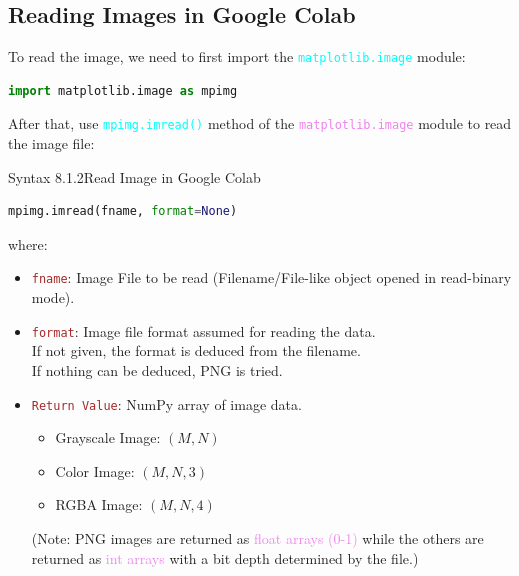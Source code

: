 \documentclass{book}
\begin{document}
\subsection{Reading Images in Google Colab}
To read the image, we need to first import the \textcolor{cyan}{\texttt{matplotlib.image}} module:
\begin{lstlisting}[language=Python, basicstyle=\ttfamily\small, keywordstyle=\color{blue}, commentstyle=\color{forestgreen}, stringstyle=\color{red}, showstringspaces=false]
                                    import matplotlib.image as mpimg
\end{lstlisting}
After that, use \textcolor{cyan}{\texttt{mpimg.imread()}} method of the \textcolor{violet}{\texttt{matplotlib.image}} module to read the image file:
\begin{synBox}{Syntax 8.1.2}{Read Image in Google Colab}
    \raggedright
    \begin{lstlisting}[language=Python, basicstyle=\ttfamily\small, keywordstyle=\color{blue}, commentstyle=\color{forestgreen}, stringstyle=\color{red}, showstringspaces=false]
                                    mpimg.imread(fname, format=None)
    \end{lstlisting}
    where:\\
    \begin{itemize}
        \item \textcolor{brown}{\texttt{fname}}: Image File to be read (Filename/File-like object opened in read-binary mode).
        \item \textcolor{brown}{\texttt{format}}: Image file format assumed for reading the data. \\
        If not given, the format is deduced from the filename. \\
        If nothing can be deduced, PNG is tried.
        \item \textcolor{brown}{\texttt{Return Value}}: NumPy array of image data.
        \begin{itemize}
            \item Grayscale Image: $(M, N)$
            \item Color Image: $(M, N, 3)$
            \item RGBA Image: $(M, N, 4)$
        \end{itemize}
        ({\small Note: PNG images are returned as \textcolor{violet}{float arrays (0-1)} while the others are returned as \textcolor{violet}{int arrays} with a bit depth determined by the file.})
    \end{itemize}
\end{synBox}
\newpage
\end{document}
